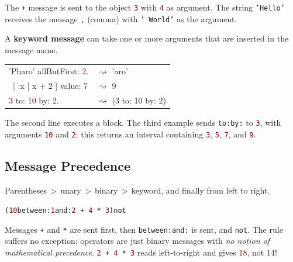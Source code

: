 \documentclass[notumble]{leaflet}
\makeatletter
\newenvironment{displaycode}{%
     \par
     \hspace{1.5em}\begin{minipage}{\linewidth}
       \begin{alltt}\small}{
       \end{alltt}
     \end{minipage}
     \par}
\newcommand{\code}[1]{\foreignlanguage{english}{\texttt{#1}}}
\makeatother
\begin{document}
The \code{+} message is sent to the object
\textcolor{darkRed}{\code{3}} with \textcolor{darkRed}{\code{4}} as
 argument. The string \textcolor{string}{\code{'Hello'}} receives the message \code{,}
(comma) with \textcolor{string}{\code{'~World'}} as the argument.

A \textbf{keyword message} can take one or more
arguments that are inserted in the message name.

\noindent
\begin{tabularx}{\linewidth}{@{}lX@{}}
        \toprule
     \textcolor{string}{'Pharo'} allButFirst: \textcolor{darkRed}{2}.& $\rightsquigarrow$ 'aro' \\
\ [ :x | x + 2 ] value: 7 & $\rightsquigarrow$ 9 \\
     \textcolor{darkRed}{3} to: \textcolor{darkRed}{10} by: \textcolor{darkRed}{2}.& $\rightsquigarrow$ (3 to: 10 by: 2)\\
       \midrule
\end{tabularx}

The second line executes a block. 
The third example sends
\code{to:by:} to \textcolor{darkRed}{\code{3}}, with arguments
\textcolor{darkRed}{\code{10}} and \textcolor{darkRed}{\code{2}}; this
returns an interval containing \textcolor{darkRed}{\code{3}},
\textcolor{darkRed}{\code{5}}, \textcolor{darkRed}{\code{7}}, and
\textcolor{darkRed}{\code{9}}. 

\vspace{-0.3cm}
\subsection{Message Precedence}

Parentheses\,$>$\,unary\,$>$\,binary\,$>$\,keyword, and finally from
left to right.

\begin{displaycode}
(\textcolor{darkRed}{10} between: \textcolor{darkRed}{1} and: \textcolor{darkRed}{2}\,+\,\textcolor{darkRed}{4}\,*\,\textcolor{darkRed}{3}) not
\end{displaycode}

Messages \code{+} and \code{*} are sent first, then \code{between:and:} is sent, and \code{not}.
The rule suffers no exception: operators are just binary messages with \emph{no notion of mathematical precedence}.
\code{\textcolor{darkRed}{2}\,+\,\textcolor{darkRed}{4}\,*\,\textcolor{darkRed}{3}} reads left-to-right and gives \textcolor{darkRed}{18}, not \textcolor{darkRed}{14}!

\vspace{-0.3cm}
\end{document}
